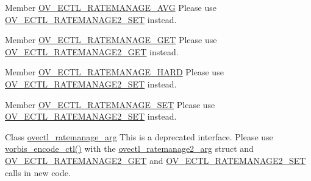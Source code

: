 \begin{DoxyRefList}
$$\item[Member \mbox{\hyperlink{vorbisenc_8h_a34c3170d227b6368041e59c1dc7ed6e4}{OV\+\_\+\+ECTL\+\_\+\+RATEMANAGE\+\_\+\+AVG}} ]\label{deprecated__deprecated000010}%
%
Please use \mbox{\hyperlink{vorbisenc_8h_a5075e0acb85fd45398a290594f83d6ba}{OV\+\_\+\+ECTL\+\_\+\+RATEMANAGE2\+\_\+\+SET}} instead. 
\item[Member \mbox{\hyperlink{vorbisenc_8h_a614481c0d84bdfbb80eed9208b68f779}{OV\+\_\+\+ECTL\+\_\+\+RATEMANAGE\+\_\+\+GET}} ]\label{deprecated__deprecated000008}%
%
Please use \mbox{\hyperlink{vorbisenc_8h_af95048070bedb467f80ce85e20057126}{OV\+\_\+\+ECTL\+\_\+\+RATEMANAGE2\+\_\+\+GET}} instead. 
\item[Member \mbox{\hyperlink{vorbisenc_8h_af8869980a805f431af57a50dffbf5d33}{OV\+\_\+\+ECTL\+\_\+\+RATEMANAGE\+\_\+\+HARD}} ]\label{deprecated__deprecated000011}%
%
Please use \mbox{\hyperlink{vorbisenc_8h_a5075e0acb85fd45398a290594f83d6ba}{OV\+\_\+\+ECTL\+\_\+\+RATEMANAGE2\+\_\+\+SET}} instead. 
\item[Member \mbox{\hyperlink{vorbisenc_8h_a1daa1fd8ce1064cce01dde3ad447d389}{OV\+\_\+\+ECTL\+\_\+\+RATEMANAGE\+\_\+\+SET}} ]\label{deprecated__deprecated000009}%
%
Please use \mbox{\hyperlink{vorbisenc_8h_a5075e0acb85fd45398a290594f83d6ba}{OV\+\_\+\+ECTL\+\_\+\+RATEMANAGE2\+\_\+\+SET}} instead. 
\item[Class \mbox{\hyperlink{structovectl__ratemanage__arg}{ovectl\+\_\+ratemanage\+\_\+arg}} ]\label{deprecated__deprecated000007}%
%
This is a deprecated interface. Please use \mbox{\hyperlink{vorbisenc_8c_a5f398a378e20b8ce5e3341a582e773bd}{vorbis\+\_\+encode\+\_\+ctl()}} with the \mbox{\hyperlink{structovectl__ratemanage2__arg}{ovectl\+\_\+ratemanage2\+\_\+arg}} struct and \mbox{\hyperlink{vorbisenc_8h_af95048070bedb467f80ce85e20057126}{OV\+\_\+\+ECTL\+\_\+\+RATEMANAGE2\+\_\+\+GET}} and \mbox{\hyperlink{vorbisenc_8h_a5075e0acb85fd45398a290594f83d6ba}{OV\+\_\+\+ECTL\+\_\+\+RATEMANAGE2\+\_\+\+SET}} calls in new code.
\end{DoxyRefList}